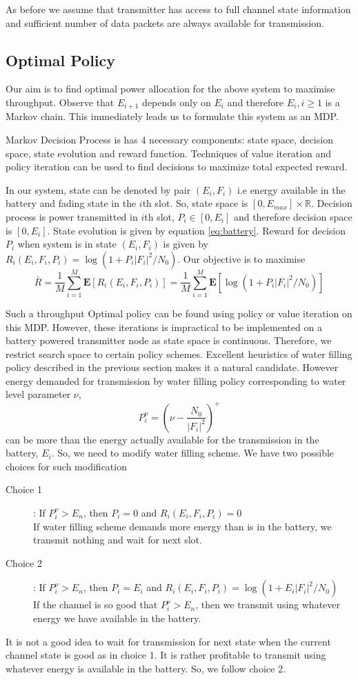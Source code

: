\documentclass[a4paper,11pt]{article}
\begin{document}
As before we assume that transmitter has access to full channel state information and sufficient number of data packets are always available for transmission. 


\subsection{Optimal Policy} 
Our aim is to find optimal power allocation for the above system to maximise throughput. Observe that $E_{i+1}$ depends only on $E_i$ and therefore $E_i , i \geq 1$ is a Markov chain. 
This immediately leads us to formulate this system as an MDP.

Markov Decision Process is has 4 necessary components: state space, decision space, state evolution and reward function. Techniques of value iteration and policy iteration can be used to find decisions to maximize total expected reward.

In our system, state can be denoted by pair $(E_i,F_i)$ i.e energy available in the battery and fading state in the $i$th slot. 
So, state space is $[0,E_{max}] \times \mathbb{R}$. 
Decision process is power transmitted in $i$th slot, $P_i \in [0,E_i]$ and therefore 
decision space is $[0, E_i]$.
State evolution is given by equation \ref{eq:battery}. Reward for decision $P_i$ when system is in state $(E_i,F_i)$ is given by $R_i(E_i,F_i,P_i) = \log(1+ P_i |F_i|^2/N_0)$.
Our objective is to maximise 
\[ \bar{R} = \frac{1}{M} \sum_{i=1}^M \mathbf{E} [R_i(E_i,F_i,P_i)] = 
\frac{1}{M}\sum_{i=1}^M\mathbf{E} [\log(1+ P_i |F_i|^2/N_0)]\] 

Such a throughput Optimal policy can be found using policy or value iteration on this MDP. However, these iterations is impractical to be implemented on a battery powered transmitter node as state space is continuous. 
Therefore, we restrict search space to certain policy schemes. Excellent heuristics of water filling policy described in the previous section makes it a natural candidate. 
However energy demanded for transmission by water filling policy corresponding to water level parameter $\nu$, \[ P^\nu_i = \left (\nu - \frac{N_0}{|F_i|^2} \right )^+\] 
can be more than the energy actually available for the transmission in the battery, $E_i$. So, we need to modify water filling scheme. We have two possible choices for such modification
\begin{description}
\item[Choice 1]: If $P^\nu_i > E_n$, then $P_i = 0$ and $R_i(E_i,F_i,P_i) = 0$\\
If water filling scheme demands more energy than is in the battery, we transmit nothing and wait for next slot.

\item[Choice 2]: If $P^\nu_i > E_n$, then $P_i = E_i$ and $R_i(E_i,F_i,P_i) = \log(1+ E_i |F_i|^2/N_0)$\\ 
If the channel is so good that $P^\nu_i > E_n$, then we transmit using whatever energy we have available in the battery.
\end{description}
It is not a good idea to wait for transmission for next state when the current channel state is good as in choice 1. It is rather profitable to transmit using whatever energy is available in the battery. So, we follow choice 2.
\end{document}
